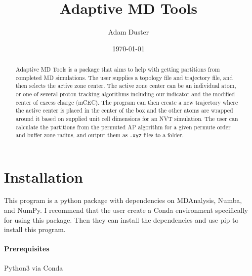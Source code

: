 \documentclass{article}
\title{Adaptive MD Tools}
\author{Adam Duster}
\date{\today}
\begin{document}
\maketitle
\begin{abstract}
Adaptive MD Tools is a package that aims to help with getting partitions from completed MD simulations.
The user supplies a topology file and trajectory file, and then selects the active zone center.
The active zone center can be an individual atom, or one of several proton tracking algorithms including our indicator and the modified center of excess charge (mCEC).
The program can then create a new trajectory where the active center is placed in the center of the box and the other atoms are wrapped around it based on supplied unit cell dimensions for an NVT simulation.
The user can calculate the partitions from the permuted AP algorithm for a given permute order and buffer zone radius, and output them as \texttt{.xyz} files to a folder.
\end{abstract}

\section{Installation}
This program is a python package with dependencies on MDAnalysis, Numba, and NumPy. I recommend that the user create a Conda environment specifically for using this package. Then they can install the dependencies and use pip to install this program.

\paragraph{Prerequisites}

Python3 via Conda
\end{document}
